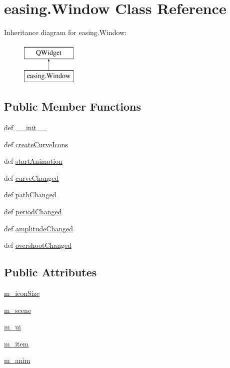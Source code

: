 \hypertarget{classeasing_1_1Window}{}\section{easing.\+Window Class Reference}
\label{classeasing_1_1Window}
Inheritance diagram for easing.\+Window\+:\begin{figure}[H]
\begin{center}
\leavevmode
\includegraphics[height=2.000000cm]{classeasing_1_1Window}
\end{center}
\end{figure}
\subsection*{Public Member Functions}
\begin{DoxyCompactItemize}
\item 
def \hyperlink{classeasing_1_1Window_aa85f8ed2662b8d844457177683fa8782}{\+\_\+\+\_\+init\+\_\+\+\_\+}
\item 
def \hyperlink{classeasing_1_1Window_a8d2d5151178878c1bc1c3cd34f3f10a8}{create\+Curve\+Icons}
\item 
def \hyperlink{classeasing_1_1Window_af596573aa1c39ba8ceac0df3a1e2b091}{start\+Animation}
\item 
def \hyperlink{classeasing_1_1Window_ae4160e7fe0f5c92d873655e6029b625d}{curve\+Changed}
\item 
def \hyperlink{classeasing_1_1Window_aef55f95618f0f086c2cc30d6bc44ae2b}{path\+Changed}
\item 
def \hyperlink{classeasing_1_1Window_acc055fd622cc2b29a380ea1c0a5a2d7b}{period\+Changed}
\item 
def \hyperlink{classeasing_1_1Window_ae1868ecd432798c92bed8e7f1a883a5e}{amplitude\+Changed}
\item 
def \hyperlink{classeasing_1_1Window_a0ab570f495b54fbed718cda6aef87989}{overshoot\+Changed}
\end{DoxyCompactItemize}
\subsection*{Public Attributes}
\begin{DoxyCompactItemize}
\item 
\hyperlink{classeasing_1_1Window_a8a14560f79117460a5130c17511a6711}{m\+\_\+icon\+Size}
\item 
\hyperlink{classeasing_1_1Window_ad9d6879b7f469b3d920f3cb9917e3d9a}{m\+\_\+scene}
\item 
\hyperlink{classeasing_1_1Window_a671f45c4796a55834d65ee29f3bbfd46}{m\+\_\+ui}
\item 
\hyperlink{classeasing_1_1Window_a5daaed6d45d39a27adc318908246c890}{m\+\_\+item}
\item 
\hyperlink{classeasing_1_1Window_ae89a7ab68a5880e687c33246cbf366b4}{m\+\_\+anim}
\end{DoxyCompactItemize}


